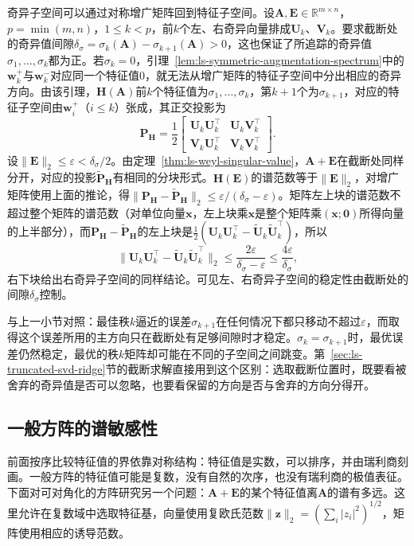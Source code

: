 奇异子空间可以通过对称增广矩阵回到特征子空间。设$\bm A,\bm E\in\mathbb R^{m\times n}$，$p=\min(m,n)$，$1\leq k<p$，前$k$个左、右奇异向量排成$\bm U_k$、$\bm V_k$。要求截断处的奇异值间隙$\delta_\sigma=\sigma_k(\bm A)-\sigma_{k+1}(\bm A)>0$，这也保证了所追踪的奇异值$\sigma_1,\ldots,\sigma_k$都为正。若$\sigma_k=0$，引理~\ref{lem:ls-symmetric-augmentation-spectrum}中的$\bm w_k^+$与$\bm w_k^-$对应同一个特征值$0$，就无法从增广矩阵的特征子空间中分出相应的奇异方向。由该引理，$\bm H(\bm A)$前$k$个特征值为$\sigma_1,\ldots,\sigma_k$，第$k+1$个为$\sigma_{k+1}$，对应的特征子空间由$\bm w_i^+$（$i\leq k$）张成，其正交投影为
\[
 \bm P_{\bm H}=\frac12\begin{bmatrix}\bm U_k\bm U_k^\top&\bm U_k\bm V_k^\top\\\bm V_k\bm U_k^\top&\bm V_k\bm V_k^\top\end{bmatrix}.
\]
设$\lVert\bm E\rVert_2\leq\varepsilon<\delta_\sigma/2$。由定理~\ref{thm:ls-weyl-singular-value}，$\bm A+\bm E$在截断处同样分开，对应的投影$\widetilde{\bm P}_{\bm H}$有相同的分块形式。$\bm H(\bm E)$的谱范数等于$\lVert\bm E\rVert_2$，对增广矩阵使用上面的推论，得$\lVert\bm P_{\bm H}-\widetilde{\bm P}_{\bm H}\rVert_2\leq\varepsilon/(\delta_\sigma-\varepsilon)$。矩阵左上块的谱范数不超过整个矩阵的谱范数（对单位向量$\bm x$，左上块乘$\bm x$是整个矩阵乘$(\bm x;\bm0)$所得向量的上半部分），而$\bm P_{\bm H}-\widetilde{\bm P}_{\bm H}$的左上块是$\tfrac12(\bm U_k\bm U_k^\top-\widetilde{\bm U}_k\widetilde{\bm U}_k^\top)$，所以
\[
 \lVert\bm U_k\bm U_k^\top-\widetilde{\bm U}_k\widetilde{\bm U}_k^\top\rVert_2\leq\frac{2\varepsilon}{\delta_\sigma-\varepsilon}\leq\frac{4\varepsilon}{\delta_\sigma},
\]
右下块给出右奇异子空间的同样结论。可见左、右奇异子空间的稳定性由截断处的间隙$\delta_\sigma$控制。

与上一小节对照：最佳秩$k$逼近的误差$\sigma_{k+1}$在任何情况下都只移动不超过$\varepsilon$，而取得这个误差所用的主方向只在截断处有足够间隙时才稳定。$\sigma_k=\sigma_{k+1}$时，最优误差仍然稳定，最优的秩$k$矩阵却可能在不同的子空间之间跳变。第~\ref{sec:ls-truncated-svd-ridge}节的截断求解直接用到这个区别：选取截断位置时，既要看被舍弃的奇异值是否可以忽略，也要看保留的方向是否与舍弃的方向分得开。

\subsection{一般方阵的谱敏感性}
\label{sec:ls-nonnormal-spectral-sensitivity}

前面按序比较特征值的界依靠对称结构：特征值是实数，可以排序，并由瑞利商刻画。一般方阵的特征值可能是复数，没有自然的次序，也没有瑞利商的极值表征。下面对可对角化的方阵研究另一个问题：$\bm A+\bm E$的某个特征值离$\bm A$的谱有多远。这里允许在复数域中选取特征基，向量使用复欧氏范数$\lVert\bm z\rVert_2=(\sum_i|z_i|^2)^{1/2}$，矩阵使用相应的诱导范数。

